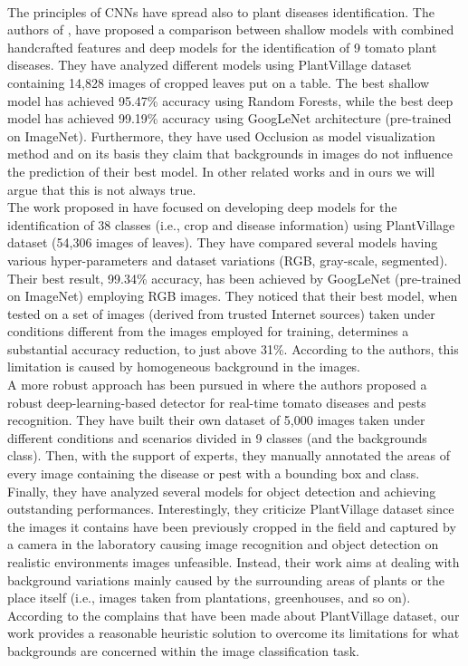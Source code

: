 \\\indent
The principles of CNNs have spread also to plant diseases identification. The authors of \cite{tunisia}, have proposed a comparison between shallow models with combined handcrafted features and deep models for the identification of 9 tomato plant diseases. They have analyzed different models using PlantVillage dataset containing 14,828 images of cropped leaves put on a table. The best shallow model has achieved 95.47\% accuracy using Random Forests, while the best deep model has achieved 99.19\% accuracy using GoogLeNet architecture (pre-trained on ImageNet). Furthermore, they have used Occlusion \cite{occlusion} as model visualization method and on its basis they claim that backgrounds in images do not influence the prediction of their best model. In other related works and in ours we will argue that this is not always true.
\\\indent
The work proposed in \cite{erba} have focused on developing deep models for the identification of 38 classes (i.e., crop and disease information) using PlantVillage dataset (54,306 images of leaves). They have compared several models having various hyper-parameters and dataset variations (RGB, gray-scale, segmented). Their best result, 99.34\% accuracy, has been achieved by GoogLeNet (pre-trained on ImageNet) employing RGB images. They noticed that their best model, when tested on a set of images (derived from trusted Internet sources) taken under conditions different from the images employed for training, determines a substantial accuracy reduction, to just above 31\%. According to the authors, this limitation is caused by homogeneous background in the images.
\\\indent
A more robust approach has been pursued in \cite{manzoni} where the authors proposed a robust deep-learning-based detector for real-time tomato diseases and pests recognition. They have built their own dataset of 5,000 images taken under different conditions and scenarios divided in 9 classes (and the backgrounds class). Then, with the support of experts, they manually annotated the areas of every image containing the disease or pest with a bounding box and class. Finally, they have analyzed several models for object detection and achieving outstanding performances. Interestingly, they criticize PlantVillage dataset since the images it contains have been previously cropped in the field and captured by a camera in the laboratory causing image recognition and object detection on realistic environments images unfeasible. Instead, their work aims at dealing with background variations mainly caused by the surrounding areas of plants or the place itself (i.e., images taken from plantations, greenhouses, and so on).
\\\indent
According to the complains that have been made about PlantVillage dataset, our work provides a reasonable heuristic solution to overcome its limitations for what backgrounds are concerned within the image classification task.